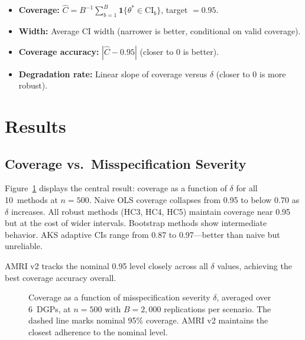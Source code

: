 \documentclass[12pt]{article}
\theoremstyle{definition}
\theoremstyle{remark}
\newcommand{\CI}{\mathrm{CI}}
\begin{document}
\begin{itemize}[nosep]
\item \textbf{Coverage:} $\hat{C} = B^{-1} \sum_{b=1}^B \mathbf{1}\{\theta^* \in \CI_b\}$, target $= 0.95$.
\item \textbf{Width:} Average CI width (narrower is better, conditional on valid coverage).
\item \textbf{Coverage accuracy:} $|\hat{C} - 0.95|$ (closer to 0 is better).
\item \textbf{Degradation rate:} Linear slope of coverage versus $\delta$ (closer to 0 is more robust).
\end{itemize}


\section{Results}\label{sec:results}

\subsection{Coverage vs.\ Misspecification Severity}

Figure~\ref{fig:coverage_delta} displays the central result: coverage as a function of $\delta$ for all 10~methods at $n = 500$. Naive OLS coverage collapses from 0.95 to below 0.70 as $\delta$ increases. All robust methods (HC3, HC4, HC5) maintain coverage near 0.95 but at the cost of wider intervals. Bootstrap methods show intermediate behavior. AKS adaptive CIs range from 0.87 to 0.97---better than naive but unreliable.

AMRI v2 tracks the nominal 0.95 level closely across all $\delta$ values, achieving the best coverage accuracy overall.

\begin{figure}[H]
\centering
\caption{Coverage as a function of misspecification severity $\delta$, averaged over 6~DGPs, at $n = 500$ with $B = 2{,}000$ replications per scenario. The dashed line marks nominal 95\% coverage. AMRI v2 maintains the closest adherence to the nominal level.}
\label{fig:coverage_delta}
\end{figure}
\end{document}
